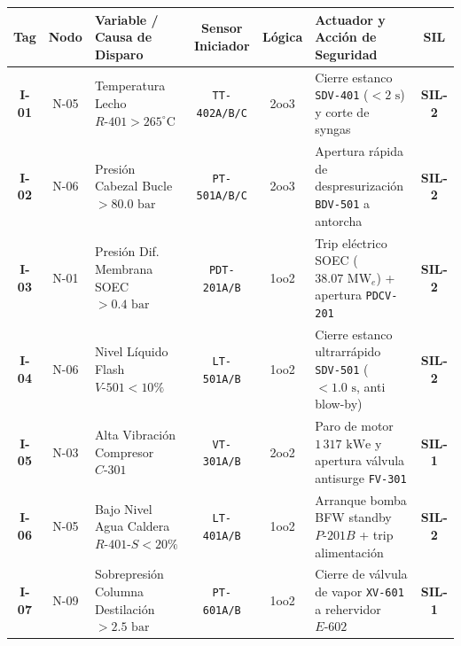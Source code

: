 \documentclass[10pt,landscape]{article}
\newcommand{\badgeamber}[1]{\colorbox{badgeamber}{\textbf{\color{amber!90!black}\fontsize{6.8pt}{8pt}\selectfont #1}}}
\newcommand{\badgered}[1]{\colorbox{badgered}{\textbf{\color{darkred}\fontsize{6.8pt}{8pt}\selectfont #1}}}
\begin{document}
\vspace{1.5pt}

\begin{center}
  \begin{tcolorbox}[colback=white,colframe=navyblue!70,arc=1.5mm,boxrule=0.7pt,top=2.0pt,bottom=2.0pt,left=3pt,right=3pt,width=\textwidth]
    \fontsize{4.8pt}{5.8pt}\selectfont
    \renewcommand{\arraystretch}{1.08}
    \begin{tabularx}{\textwidth}{c c p{3.2cm} c c X c}
      \toprule
      \rowcolor{tableheader}
      \textbf{\color{white}Tag} & \textbf{\color{white}Nodo} & \textbf{\color{white}Variable / Causa de Disparo} & \textbf{\color{white}Sensor Iniciador} & \textbf{\color{white}Lógica} & \textbf{\color{white}Actuador y Acción de Seguridad} & \textbf{\color{white}SIL} \\
      \midrule
      \rowcolor{roweven}
      \textbf{I-01} & N-05 & Temperatura Lecho $R\text{-}401 > 265^\circ\text{C}$ & \texttt{TT-402A/B/C} & 2oo3 & Cierre estanco \texttt{SDV-401} ($<2\text{ s}$) y corte de syngas & \badgered{SIL-2} \\
      \rowcolor{rowodd}
      \textbf{I-02} & N-06 & Presión Cabezal Bucle $> 80.0\text{ bar}$ & \texttt{PT-501A/B/C} & 2oo3 & Apertura rápida de despresurización \texttt{BDV-501} a antorcha & \badgered{SIL-2} \\
      \rowcolor{roweven}
      \textbf{I-03} & N-01 & Presión Dif. Membrana SOEC $> 0.4\text{ bar}$ & \texttt{PDT-201A/B} & 1oo2 & Trip eléctrico SOEC ($38.07\text{ MW}_e$) + apertura \texttt{PDCV-201} & \badgered{SIL-2} \\
      \rowcolor{rowodd}
      \textbf{I-04} & N-06 & Nivel Líquido Flash $V\text{-}501 < 10\%$ & \texttt{LT-501A/B} & 1oo2 & Cierre estanco ultrarrápido \texttt{SDV-501} ($<1.0\text{ s}$, anti blow-by) & \badgered{SIL-2} \\
      \rowcolor{roweven}
      \textbf{I-05} & N-03 & Alta Vibración Compresor $C\text{-}301$ & \texttt{VT-301A/B} & 2oo2 & Paro de motor $1\,317\text{ kWe}$ y apertura válvula antisurge \texttt{FV-301} & \badgeamber{SIL-1} \\
      \rowcolor{rowodd}
      \textbf{I-06} & N-05 & Bajo Nivel Agua Caldera $R\text{-}401\text{-}S < 20\%$ & \texttt{LT-401A/B} & 1oo2 & Arranque bomba BFW standby $P\text{-}201B$ + trip alimentación & \badgered{SIL-2} \\
      \rowcolor{roweven}
      \textbf{I-07} & N-09 & Sobrepresión Columna Destilación $> 2.5\text{ bar}$ & \texttt{PT-601A/B} & 1oo2 & Cierre de válvula de vapor \texttt{XV-601} a rehervidor $E\text{-}602$ & \badgeamber{SIL-1} \\

\end{tabularx}
\end{tcolorbox}
\end{center}
\end{document}
